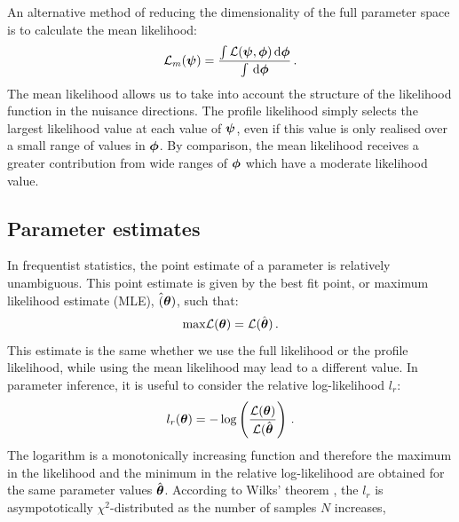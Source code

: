 An alternative method of reducing the dimensionality of the full parameter space is to calculate the mean likelihood:
\begin{equation}
\label{eq:parameter:meanlikelihood}
\mathcal{L}_m(\boldsymbol{\psi}) = \frac{\int \mathcal{L}(\boldsymbol\psi, \boldsymbol\phi) \, \mathrm{d}\boldsymbol\phi}{\int \, \mathrm{d}\boldsymbol\phi}\,.
\end{equation}
The mean likelihood allows us to take into account the structure of the likelihood function in the nuisance directions. The profile likelihood simply selects the largest likelihood value at each value of $\boldsymbol\psi$, even if this value is only realised over a small range of values in $\boldsymbol\phi$. By comparison, the mean likelihood receives a greater contribution from wide ranges of $\boldsymbol\phi$ which have a moderate likelihood value.

\subsection{Parameter estimates}
\label{sec:ParamRecon:freqparams}
In frequentist statistics, the point estimate of a parameter is relatively unambiguous. This point estimate is given by the best fit point, or maximum likelihood estimate (MLE), $\hat(\boldsymbol\theta)$, such that:
\begin{equation}
\textrm{max}\mathcal{L}(\boldsymbol\theta) = \mathcal{L}(\hat{\boldsymbol\theta})\,.
\end{equation}
This estimate is the same whether we use the full likelihood or the profile likelihood, while using the mean likelihood may lead to a different value. In parameter inference, it is useful to consider the relative log-likelihood $l_r$:
\begin{equation}
l_r(\boldsymbol\theta) = -\log\left(\frac{\mathcal{L}(\boldsymbol\theta)}{\mathcal{L}(\hat{\boldsymbol\theta}}\right)\,.
\end{equation}
The logarithm is a monotonically increasing function and therefore the maximum in the likelihood and the minimum in the relative log-likelihood are obtained for the same parameter values $\hat{\boldsymbol\theta}$. According to Wilks' theorem \cite{Wilks:1938}, the $l_r$ is asympototically $\chi^2$-distributed as the number of samples $N$ increases,

